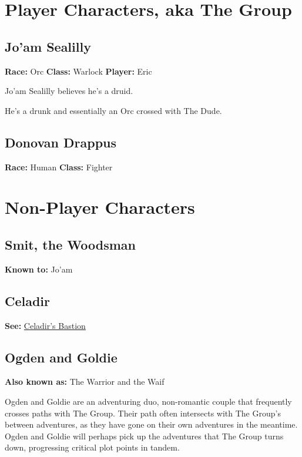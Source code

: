 \documentclass{report}
\newif\ifdm
\newcommand{\dmonly}[1]{\ifdm{\color{blue}\textit{[DM Only:]} #1}\else{}\fi}
\newcommand{\headeritem}[2]{\newline\textbf{#1:} #2}
\newcommand{\race}[1]{\headeritem{Race}{#1}}
\newcommand{\class}[1]{\headeritem{Class}{#1}}
\newcommand{\player}[1]{\headeritem{Player}{#1}}
\begin{document}
  \chapter{Player Characters, aka The Group}\label{ch:playerCharacters,AkaTheGroup}

  \section{Jo'am Sealilly}\label{sec:jo'amSealilly}
  \race{Orc} \class{Warlock} \player{Eric} \medskip

  Jo'am Sealilly believes he's a druid.

  He's a drunk and essentially an Orc crossed with The Dude.

  \section{Donovan Drappus}\label{sec:donovanDrappus}
  \race{Human} \class{Fighter} \medskip


  \chapter{Non-Player Characters}\label{ch:non-playerCharacters}
  \section{Smit, the Woodsman}
  \headeritem{Known to}{Jo'am}

  \dmonly{Captured by cultists in Preface A}

  \section{Celadir}\label{sec:celadir}
  \headeritem{See}{\hyperref[sec:celadir'sBastion]{Celadir's Bastion}}

  \section{Ogden and Goldie}\label{sec:ogdenAndGoldie}
  \headeritem{Also known as}{The Warrior and the Waif}

  Ogden and Goldie are an adventuring duo, non-romantic couple that frequently crosses paths with
   The Group.
  Their path often intersects with The Group's between adventures, as they have gone on their own
  adventures in the meantime.
  Ogden and Goldie will perhaps pick up the adventures that The Group turns down, progressing
  critical plot points in tandem.
\end{document}
